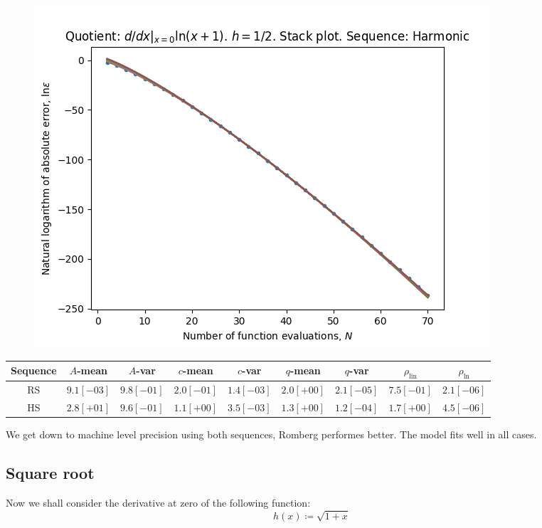 \begin{figure}[H]
\centering
\begin{minipage}{0.45\textwidth}
\centering
\includegraphics[scale=0.45]{../results/diff_quot_plots/h_one_hp_harmonic_stack.png}
\end{minipage}
\end{figure}

\begin{table}[H]
    \centering
    \small
    \begin{tabular}{c||c|c|c|c|c|c|c|c}
Sequence & \(A\)-mean & \(A\)-var & \(c\)-mean & \(c\)-var & \(q\)-mean & \(q\)-var & \(\rho_{\operatorname{lin}}\) & \(\rho_{\ln}\)\\\hline
\rowcolor{green}
RS & \(9.1[-03]\) & \(9.8[-01]\) & \(2.0[-01]\) & \(1.4[-03]\) & \(2.0[+00]\) & \(2.1[-05]\) & \(7.5[-01]\) & \(2.1[-06]\) \\
\rowcolor{green}
HS & \(2.8[+01]\) & \(9.6[-01]\) & \(1.1[+00]\) & \(3.5[-03]\) & \(1.3[+00]\) & \(1.2[-04]\) & \(1.7[+00]\) & \(4.5[-06]\) \\
    \end{tabular}
    \label{tab:my_label}
\end{table}

We get down to machine level precision using both sequences, Romberg performes better. The model fits well in all cases.

\subsection{Square root}

Now we shall consider the derivative at zero of the following function:
\[
h(x) \coloneqq \sqrt{1 + x}
\]

